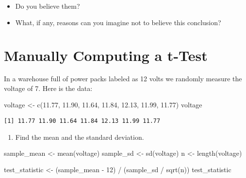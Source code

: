 \documentclass[
  letterpaper,
  DIV=11,
  numbers=noendperiod]{scrreprt}
\newenvironment{Shaded}{\begin{snugshade}}{\end{snugshade}}
\newcommand{\DecValTok}[1]{\textcolor[rgb]{0.68,0.00,0.00}{#1}}
\newcommand{\FloatTok}[1]{\textcolor[rgb]{0.68,0.00,0.00}{#1}}
\newcommand{\FunctionTok}[1]{\textcolor[rgb]{0.28,0.35,0.67}{#1}}
\newcommand{\NormalTok}[1]{\textcolor[rgb]{0.00,0.23,0.31}{#1}}
\newcommand{\OtherTok}[1]{\textcolor[rgb]{0.00,0.23,0.31}{#1}}
\newcommand{\SpecialCharTok}[1]{\textcolor[rgb]{0.37,0.37,0.37}{#1}}
\providecommand{\tightlist}{%
  \setlength{\itemsep}{0pt}\setlength{\parskip}{0pt}}\usepackage{longtable,booktabs,array}
\begin{document}
\begin{itemize}
\tightlist
\item
  Do you believe them?
\item
  What, if any, reasons can you imagine not to believe this conclusion?
\end{itemize}

\section{Manually Computing a t-Test}\label{manually-computing-a-t-test}

In a warehouse full of power packs labeled as 12 volts we randomly
measure the voltage of 7. Here is the data:

\begin{Shaded}
\begin{Highlighting}[]
\NormalTok{voltage }\OtherTok{\textless{}{-}} \FunctionTok{c}\NormalTok{(}\FloatTok{11.77}\NormalTok{, }\FloatTok{11.90}\NormalTok{, }\FloatTok{11.64}\NormalTok{, }\FloatTok{11.84}\NormalTok{, }\FloatTok{12.13}\NormalTok{, }\FloatTok{11.99}\NormalTok{,  }\FloatTok{11.77}\NormalTok{)}
\NormalTok{voltage}
\end{Highlighting}
\end{Shaded}

\begin{verbatim}
[1] 11.77 11.90 11.64 11.84 12.13 11.99 11.77
\end{verbatim}

\begin{enumerate}
\def\labelenumi{\arabic{enumi}.}
\tightlist
\item
  Find the mean and the standard deviation.
\end{enumerate}

\begin{Shaded}
\begin{Highlighting}[]
\NormalTok{sample\_mean }\OtherTok{\textless{}{-}} \FunctionTok{mean}\NormalTok{(voltage)}
\NormalTok{sample\_sd   }\OtherTok{\textless{}{-}} \FunctionTok{sd}\NormalTok{(voltage)}
\NormalTok{n           }\OtherTok{\textless{}{-}} \FunctionTok{length}\NormalTok{(voltage)}

\NormalTok{test\_statistic }\OtherTok{\textless{}{-}}\NormalTok{ (sample\_mean }\SpecialCharTok{{-}} \DecValTok{12}\NormalTok{) }\SpecialCharTok{/}\NormalTok{ (sample\_sd }\SpecialCharTok{/} \FunctionTok{sqrt}\NormalTok{(n))}
\NormalTok{test\_statistic}
\end{Highlighting}
\end{Shaded}
\end{document}
